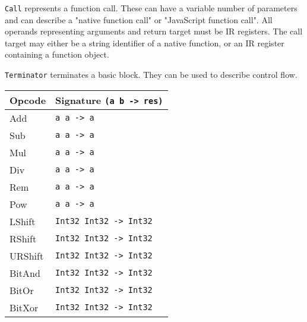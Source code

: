 \texttt{Call} represents a function call. These can have a variable number of parameters and can describe a "native function call" or "JavaScript function call". All operands representing arguments and return target must be IR registers. The call target may either be a string identifier of a native function, or an IR register containing a function object.

\texttt{Terminator} terminates a basic block. They can be used to describe control flow.


\begin{table}
    \centering
    \begin{tabular}{l | l}
        Opcode      & Signature \texttt{(a b -> res)}                                                   \\\hline
        Add         & \texttt{a      a     -> a                                                       } \\
        Sub         & \texttt{a      a     -> a                                                       } \\
        Mul         & \texttt{a      a     -> a                                                       } \\
        Div         & \texttt{a      a     -> a                                                       } \\
        Rem         & \texttt{a      a     -> a                                                       } \\
        Pow         & \texttt{a      a     -> a                                                       } \\
        LShift      & \texttt{Int32  Int32 -> Int32                                                   } \\
        RShift      & \texttt{Int32  Int32 -> Int32                                                   } \\
        URShift     & \texttt{Int32  Int32 -> Int32                                                   } \\
        BitAnd      & \texttt{Int32  Int32 -> Int32                                                   } \\
        BitOr       & \texttt{Int32  Int32 -> Int32                                                   } \\
        BitXor      & \texttt{Int32  Int32 -> Int32                                                   } \\

\end{tabular}
\end{table}
